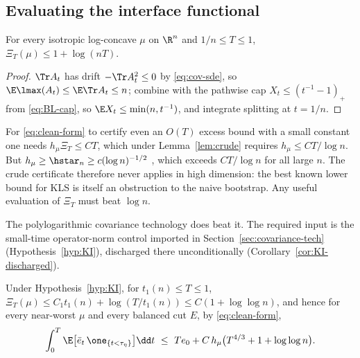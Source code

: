 \documentclass[../../main.tex]{subfiles}
\begin{document}
\subsection{Evaluating the interface functional}
\label{subsec:interface}

\begin{lemma}
\label{lem:crude}
For every isotropic log-concave $\mu$ on $\R^n$ and $1/n\le T\le1$,
$\Xi_T(\mu)\le1+\log(nT)$.
\end{lemma}

\begin{proof}
$\Tr A_t$ has drift $-\Tr A_t^2\le0$ by \eqref{eq:cov-sde}, so
$\E\lmax(A_t)\le\E\Tr A_t\le n$; combine with the pathwise cap
$X_t\le(t^{-1}-1)_+$ from \eqref{eq:BL-cap}, so $\E X_t\le\min(n,t^{-1})$, and integrate
splitting at $t=1/n$.
\end{proof}

\begin{remark}
\label{rem:insufficiency}
For \eqref{eq:clean-form} to certify even an $O(T)$ excess bound with a small constant one
needs $h_\mu\Xi_T\le CT$, which under Lemma~\ref{lem:crude} requires $h_\mu\le CT/\log n$. But
$h_\mu\ge\hstar_n\ge c(\log n)^{-1/2}$ \cite{Klartag2023Logarithmic}, which exceeds $CT/\log n$ for all
large $n$. The crude certificate therefore never applies in high dimension: the best known
lower bound for KLS is itself an obstruction to the naive bootstrap. Any useful evaluation of
$\Xi_T$ must beat $\log n$.
\end{remark}

The polylogarithmic covariance technology does beat it. The required input is the small-time
operator-norm control imported in Section~\ref{sec:covariance-tech}
(Hypothesis~\ref{hyp:KI}), discharged there unconditionally
(Corollary~\ref{cor:KI-discharged}).

\begin{corollary}
\label{cor:loglog}
Under Hypothesis~\ref{hyp:KI}, for $t_1(n)\le T\le1$,
$\Xi_T(\mu)\le C_1t_1(n)+\log(T/t_1(n))\le C(1+\log\log n)$, and hence for every near-worst
$\mu$ and every balanced cut $E$, by \eqref{eq:clean-form},
\begin{equation}\label{eq:loglog-supply}
  \int_0^T\E\bigl[\bar e_t\,\one_{\{t<\tau_\eta\}}\bigr]\dd t
  \ \le\ Te_0+C\,h_\mu\bigl(T^{4/3}+1+\log\log n\bigr).
\end{equation}
\end{corollary}
\end{document}
